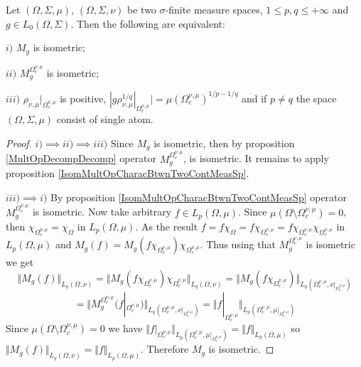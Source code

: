 \begin{proposition}\label{IsomMultOpCharacBtwnTwoMeasSp} Let $(\Omega,\Sigma,\mu)$, $(\Omega,\Sigma,\nu)$ be two $\sigma$-finite measure spaces, $1\leq p,q\leq +\infty$ and $g\in L_0(\Omega,\Sigma)$. Then the following are equivalent:

$i)$ $M_g$ is isometric;

$ii)$ $M_g^{\Omega_c^{\nu,\mu}}$ is isometric;

$iii)$ $\rho_{\nu,\mu}|_{\Omega_c^{\nu,\mu}}$ is positive, $|g  \rho_{\nu,\mu}^{1/q}|_{\Omega_c^{\nu,\mu}}|=\mu(\Omega_c^{\nu,\mu})^{1/p-1/q}$ and if  $p\neq q$ the space $(\Omega,\Sigma,\mu)$ consist of single atom.
\end{proposition}
\begin{proof}
$i)$$\implies$$ ii)$$\implies$$ iii)$ Since $M_g$ is isometric, then by proposition \ref{MultOpDecompDecomp} operator $M_g^{\Omega_c^{\nu,\mu}}$, is isometric. It remains to apply proposition \ref{IsomMultOpCharacBtwnTwoContMeasSp}.

$iii)$$\implies$$ i)$ By proposition \ref{IsomMultOpCharacBtwnTwoContMeasSp} operator $M_g^{\Omega_c^{\nu,\mu}}$ is isometric. Now take arbitrary $f\in L_p(\Omega,\mu)$. Since $\mu(\Omega\setminus\Omega_c^{\nu,\mu})=0$, then $\chi_{\Omega_c^{\nu,\mu}}=\chi_{\Omega}$ in $L_p(\Omega,\mu)$. As the result $f=f\chi_{\Omega}=f\chi_{\Omega_c^{\nu,\mu}}=f\chi_{\Omega_c^{\nu,\mu}}\chi_{\Omega_c^{\nu,\mu}}$ in $L_p(\Omega,\mu)$ and $M_g(f)=M_g(f\chi_{\Omega_c^{\nu,\mu}})\chi_{\Omega_c^{\nu,\mu}}$. Thus using that $M_g^{\Omega_c^{\nu,\mu}}$ is isometric we get
$$
\Vert M_g(f)\Vert_{L_q(\Omega,\nu)}
=\Vert M_g(f\chi_{\Omega_c^{\nu,\mu}})\chi_{\Omega_c^{\nu,\mu}}\Vert_{L_q(\Omega,\nu)}
=\Vert M_g(f\chi_{\Omega_c^{\nu,\mu}})\Vert_{L_q(\Omega_c^{\nu,\mu},\nu|_{\Omega_c^{\nu,\mu}})}
$$
$$
=\Vert M_g^{\Omega_c^{\nu,\mu}}(f|_{\Omega_c^{\nu,\mu}})\Vert_{L_q(\Omega_c^{\nu,\mu},\nu|_{\Omega_c^{\nu,\mu}})}
=\Vert f|_{\Omega_c^{\nu,\mu}}\Vert_{L_p(\Omega_c^{\nu,\mu},\mu|_{\Omega_c^{\nu,\mu}})}
$$
Since $\mu(\Omega\setminus\Omega_c^{\nu,\mu})=0$ we have $\Vert f|_{\Omega_c^{\nu,\mu}}\Vert_{L_p(\Omega_c^{\nu,\mu},\mu|_{\Omega_c^{\nu,\mu}})}=\Vert f\Vert_{L_p(\Omega,\mu)}$ so $\Vert M_g(f)\Vert_{L_q(\Omega,\nu)}=\Vert f\Vert_{L_p(\Omega,\mu)}$. Therefore $M_g$ is isometric.
\end{proof}

